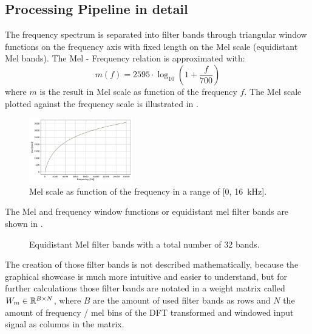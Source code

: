 
\subsection{Processing Pipeline in detail}
The frequency spectrum is separated into filter bands through triangular window functions on the frequency axis with fixed length on the Mel scale (equidistant Mel bands).
The Mel - Frequency relation is approximated with:
\begin{equation}\label{eq:signal_mfcc_mel}
  m(f) = 2595 \cdot \log_{10} \left(1 + \frac{f}{700} \right) 
\end{equation}
where $m$ is the result in Mel scale as function of the frequency $f$.
The Mel scale plotted against the frequency scale is illustrated in .
\begin{figure}[!ht]
  \centering
  \includegraphics[width=0.40\textwidth]{./3_signal/figs/signal_mfcc_mel_scale}
  \caption{Mel scale as function of the frequency in a range of [0, \SI{16}{\kilo\hertz}].}
  \label{fig:signal_mfcc_mel_scale}
\end{figure}
\FloatBarrier
\noindent
The Mel and frequency window functions or equidistant mel filter bands are shown in .
\begin{figure}[!ht]
  \centering
  \quad
  \caption{Equidistant Mel filter bands with a total number of 32 bands.}
  \label{fig:filter_bands}
\end{figure}
\FloatBarrier
\noindent
The creation of those filter bands is not described mathematically, because the graphical showcase is much more intuitive and easier to understand, but for further calculations those filter bands are notated in a weight matrix called $W_m \in \mathbb{R}^{B \times N}$, where $B$ are the amount of used filter bands as rows and $N$ the amount of frequency / mel bins of the DFT transformed and windowed input signal as columns in the matrix.

